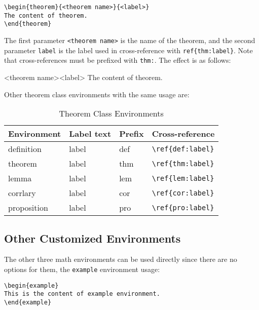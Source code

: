 \documentclass{elegantbook}
\begin{document}
\begin{lstlisting}[frame=single]
\begin{theorem}{<theorem name>}{<label>}
The content of theorem.
\end{theorem}
\end{lstlisting}

The first parameter \lstinline{<theorem name>} is the name of the theorem, and the second parameter \lstinline{label} is the label used in cross-reference with \verb|ref{thm:label}|. Note that cross-references must be prefixed with \lstinline{thm:}. The effect is as follows:

\begin{theorem}{<theorem name>}{<label>}
The content of theorem.
\end{theorem}

Other theorem class environments with the same usage are:

\begin{table}[htbp]
   \centering
   \caption{Theorem Class Environments}
     \begin{tabular}{llll}
     \toprule
     Environment & Label text & Prefix & Cross-reference \\
     \midrule
     definition & label & def   & \lstinline|\ref{def:label}| \\
     theorem & label & thm   & \lstinline|\ref{thm:label}| \\
     lemma & label & lem   & \lstinline|\ref{lem:label}| \\
     corrlary & label & cor   & \lstinline|\ref{cor:label}| \\
     proposition & label & pro   & \lstinline|\ref{pro:label}| \\
     \bottomrule
     \end{tabular}%
   \label{tab:theorem-class}%
 \end{table}%
 

\subsection{Other Customized Environments}
The other three math environments can be used directly since there are no options for them, the \lstinline{example} environment usage:

\begin{lstlisting}[frame=single]
\begin{example}
This is the content of example environment.
\end{example}
\end{lstlisting}
\end{document}
